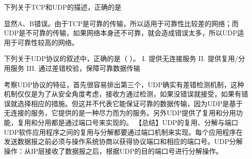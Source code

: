 \question 下列关于TCP和UDP的描述，正确的是
\par{}
\begin{solution}显然A、B错误。由于TCP是可靠的传输，所以适用于可靠性比较差的网络；而UDP是不可靠的传输，如果网络本身还不可靠，就会造成错误太多，所以UDP适用于可靠性较高的网络。
\end{solution}
\question 下列关于UDP协议的叙述中，正确的是（ ）。 I. 提供无连接服务 II.
提供复用/分用服务 III. 通过差错校验，保障可靠数据传输
\par{}
\begin{solution}考察UDP协议的特征，首先很容易排出第三个，UDP确实有差错检测机制，这种机制仅仅是为了从安全角度考虑，接收方通过检测，如果没错误就接受，如果有错误就选择相应的措施。但这并不代表它能保证可靠的数据传输，因为UDP是基于无连接的服务，它提供的是一种尽力而为的服务。另外UDP提供了复用和分用功能，复用和分用都是通过端口号来实现的。
【总结】UDP的复用、分解与端口UDP软件应用程序之间的复用与分解都要通过端口机制来实现。每个应用程序在发送数据报之前必须与操作系统协商以获得协议端口和相应的端口号。UDP分解操作：从IP层接收了数据报之后，根据UDP的目的端口号进行分解操作。
\end{solution}
